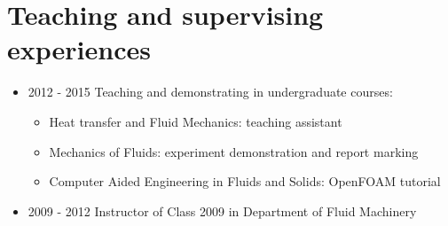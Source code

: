 \documentclass[letterpaper]{article}
\begin{document}
\vspace{-12pt}
\section*{Teaching and supervising experiences}
\vspace{-10pt}

\begin{itemize}
\item	2012 - 2015  \hspace{2pt} Teaching and demonstrating in undergraduate courses:
		\begin{itemize}
		\item	Heat transfer and Fluid Mechanics: teaching assistant
		\item	Mechanics of Fluids: experiment demonstration and report marking
		\item	Computer Aided Engineering in Fluids and Solids: OpenFOAM tutorial
		\end{itemize}

\item	2009 - 2012  \hspace{2pt} Instructor of Class 2009 in Department of Fluid Machinery
\end{itemize}

\end{document}
